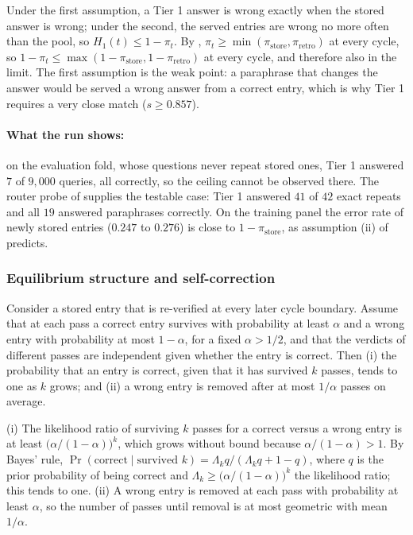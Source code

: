 \begin{sketch}
Under the first assumption, a Tier 1 answer is wrong exactly when the stored answer is wrong; under the second, the served entries are wrong no more often than the pool, so $H_{1}(t) \le 1 - \pi_t$. By , $\pi_t \ge \min(\pi_{\text{store}}, \pi_{\text{retro}})$ at every cycle, so $1 - \pi_t \le \max(1-\pi_{\text{store}}, 1-\pi_{\text{retro}})$ at every cycle, and therefore also in the limit. The first assumption is the weak point: a paraphrase that changes the answer would be served a wrong answer from a correct entry, which is why Tier 1 requires a very close match ($s \ge 0.857$).
\end{sketch}

\paragraph{What the run shows:} on the evaluation fold, whose questions never repeat stored ones, Tier 1 answered $7$ of $9{,}000$ queries, all correctly, so the ceiling cannot be observed there. The router probe of  supplies the testable case: Tier 1 answered $41$ of $42$ exact repeats and all $19$ answered paraphrases correctly. On the training panel the error rate of newly stored entries ($0.247$ to $0.276$) is close to $1 - \pi_{\text{store}}$, as assumption (ii) of  predicts.

\subsubsection{Equilibrium structure and self-correction}
\label{sec:theorem-corollaries}

\begin{heuristic}
\label{cor:self-correction}
Consider a stored entry that is re-verified at every later cycle boundary. Assume that at each pass a correct entry survives with probability at least $\alpha$ and a wrong entry with probability at most $1-\alpha$, for a fixed $\alpha > 1/2$, and that the verdicts of different passes are independent given whether the entry is correct. Then (i) the probability that an entry is correct, given that it has survived $k$ passes, tends to one as $k$ grows; and (ii) a wrong entry is removed after at most $1/\alpha$ passes on average.
\end{heuristic}

\begin{sketch}
(i) The likelihood ratio of surviving $k$ passes for a correct versus a wrong entry is at least $\big(\alpha/(1-\alpha)\big)^{k}$, which grows without bound because $\alpha/(1-\alpha) > 1$. By Bayes' rule, $\Pr(\text{correct} \mid \text{survived } k) = \Lambda_k q / (\Lambda_k q + 1 - q)$, where $q$ is the prior probability of being correct and $\Lambda_k \ge \big(\alpha/(1-\alpha)\big)^{k}$ the likelihood ratio; this tends to one. (ii) A wrong entry is removed at each pass with probability at least $\alpha$, so the number of passes until removal is at most geometric with mean $1/\alpha$.
\end{sketch}


